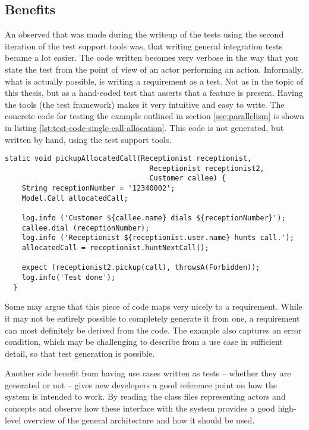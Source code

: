 \subsection{Benefits}
An observed that was made during the writeup of the tests using the second iteration of the test support tools was, that writing general integration tests became a lot easier. The code written becomes very verbose in the way that you state the test from the point of view of an actor performing an action. Informally, what is actually possible, is writing a requirement as a test. Not as in the topic of this thesis, but as a hand-coded test that asserts that a feature is present. Having the tools (the test framework) makes it very intuitive and easy to write. The concrete code for testing the example outlined in section \ref{sec:parallelism} is shown in listing \ref{lst:test-code-single-call-allocation}. This code is not generated, but written by hand, using the test support tools.
\begin{lstlisting}[style=Dart, caption=Test code for single call allocation,label={lst:test-code-single-call-allocation}]
  static void pickupAllocatedCall(Receptionist receptionist, 
                                  Receptionist receptionist2, 
                                  Customer callee) {
    String receptionNumber = '12340002';
    Model.Call allocatedCall;
    
    log.info ('Customer ${callee.name} dials ${receptionNumber}');
    callee.dial (receptionNumber);
    log.info ('Receptionist ${receptionist.user.name} hunts call.');
    allocatedCall = receptionist.huntNextCall();
   
    expect (receptionist2.pickup(call), throwsA(Forbidden));
    log.info('Test done');
  }
\end{lstlisting}
Some may argue that this piece of code maps very nicely to a requirement. While it may not be entirely possible to completely generate it from one, a requirement can most definitely be derived from the code. The example also captures an error condition, which may be challenging to describe from a use case in sufficient detail, so that test generation is possible.\medskip

\noindent Another side benefit from having use cases written as tests -- whether they are generated or not -- gives new developers a good reference point on how the system is intended to work. By reading the class files representing actors and concepts and observe how these interface with the system provides a good high-level overview of the general architecture and how it should be used.

